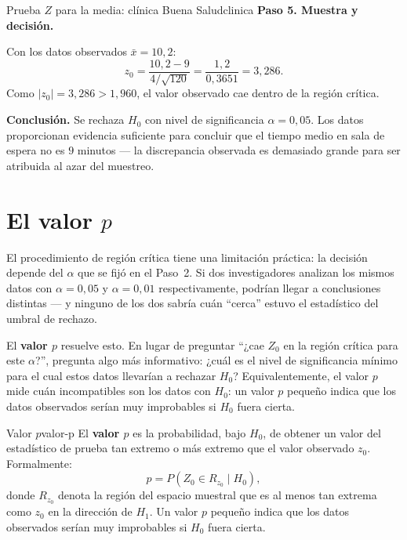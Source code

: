 \documentclass[12pt, a4paper]{book}
\numberwithin{equation}{chapter}
\begin{document}
\begin{ejemplo}{Prueba $Z$ para la media: cl\'{i}nica
		Buena Salud}{clinica}
	\medskip
	\textbf{Paso 5. Muestra y decisi\'{o}n.}
	
	Con los datos observados $\bar{x} = 10{,}2$:
	\[
	z_0 = \frac{10{,}2 - 9}{4/\sqrt{120}}
	= \frac{1{,}2}{0{,}3651}
	= 3{,}286.
	\]
	Como $|z_0| = 3{,}286 > 1{,}960$, el valor
	observado cae dentro de la regi\'{o}n cr\'{i}tica.
	
	\medskip
	\textbf{Conclusi\'{o}n.} Se rechaza $H_0$ con
	nivel de significancia $\alpha = 0{,}05$. Los
	datos proporcionan evidencia suficiente para
	concluir que el tiempo medio en sala de espera
	no es $9$ minutos --- la discrepancia observada
	es demasiado grande para ser atribuida al azar
	del muestreo.
	
\end{ejemplo}


\section{El valor $p$}

El procedimiento de regi\'{o}n cr\'{i}tica tiene
una limitaci\'{o}n pr\'{a}ctica: la decisi\'{o}n
depende del $\alpha$ que se fij\'{o} en el Paso~2.
Si dos investigadores analizan los mismos datos
con $\alpha = 0{,}05$ y $\alpha = 0{,}01$
respectivamente, podr\'{i}an llegar a conclusiones
distintas --- y ninguno de los dos sabr\'{i}a
cu\'{a}n ``cerca'' estuvo el estad\'{i}stico del
umbral de rechazo.

El \textbf{valor $p$} resuelve esto. En lugar de
preguntar ``¿cae $Z_0$ en la regi\'{o}n cr\'{i}tica
para este $\alpha$?'', pregunta algo m\'{a}s
informativo: ¿cu\'{a}l es el nivel de significancia
m\'{i}nimo para el cual estos datos llevar\'{i}an
a rechazar $H_0$? Equivalentemente, el valor $p$
mide cu\'{a}n incompatibles son los datos con
$H_0$: un valor $p$ peque\~{n}o indica que los
datos observados ser\'{i}an muy improbables si
$H_0$ fuera cierta.

\begin{definicion}{Valor $p$}{valor-p}
	El \textbf{valor $p$} es la probabilidad,
	bajo $H_0$, de obtener un valor del
	estad\'{i}stico de prueba tan extremo o
	m\'{a}s extremo que el valor observado $z_0$.
	Formalmente:
	\[
	p = P(Z_0 \in R_{z_0} \mid H_0),
	\]
	donde $R_{z_0}$ denota la regi\'{o}n del
	espacio muestral que es al menos tan extrema
	como $z_0$ en la direcci\'{o}n de $H_1$.
	Un valor $p$ peque\~{n}o indica que los datos
	observados ser\'{i}an muy improbables si $H_0$
	fuera cierta.
\end{definicion}
\end{document}
